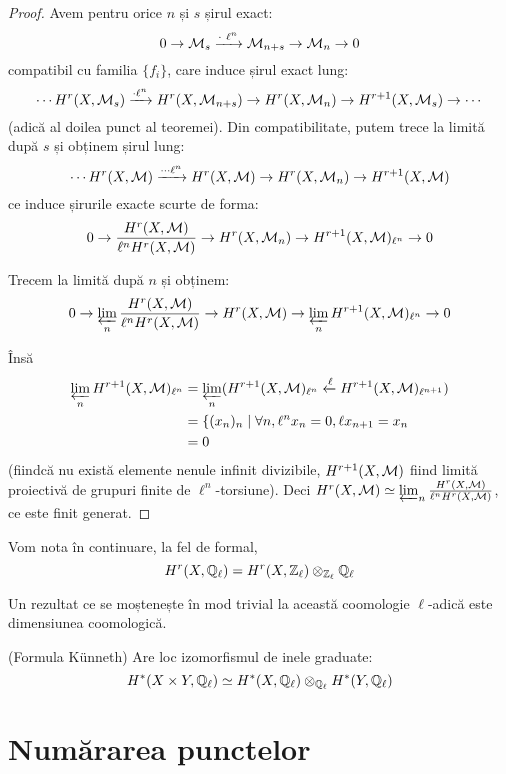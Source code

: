 \documentclass[13pt,openany]{book}
\begin{document}
\begin{proof}
Avem pentru orice $n$ și $s$ șirul exact:
$$0 \rightarrow \mathcal{M}_s \xrightarrow{\cdot\ \ell^n} \mathcal{M}_{n+s} \rightarrow \mathcal{M}_n \rightarrow 0$$
compatibil cu familia $\{f_i\}$, care induce șirul exact lung:
$$\cdots H^r(X,\mathcal{M}_s) \xrightarrow{\cdot \ell^n} H^r(X,\mathcal{M}_{n+s}) \rightarrow H^r(X,\mathcal{M}_n) \rightarrow H^{r+1}(X,\mathcal{M}_s) \rightarrow \cdots$$
(adică al doilea punct al teoremei).
Din compatibilitate, putem trece la limită după $s$ și obținem șirul lung:
$$\cdots H^r(X,\mathcal{M}) \xrightarrow{\cdots \ell^n} H^r(X,\mathcal{M}) \rightarrow H^r(X,\mathcal{M}_n) \rightarrow H^{r+1}(X,\mathcal{M})$$
ce induce șirurile exacte scurte de forma:
$$0 \rightarrow \frac{H^r(X,\mathcal{M})}{\ell^n H^r(X,\mathcal{M})} \rightarrow H^r(X,\mathcal{M}_n) \rightarrow H^{r+1}(X,\mathcal{M})_{\ell^n} \rightarrow 0$$

Trecem la limită după $n$ și obținem:
$$0 \rightarrow \varprojlim_n \frac{H^r(X,\mathcal{M})}{\ell^n H^r(X,\mathcal{M})} \rightarrow H^r(X,\mathcal{M}) \rightarrow \varprojlim_n H^{r+1}(X,\mathcal{M})_{\ell^n} \rightarrow 0$$

Însă
\begin{align*}
\varprojlim_n H^{r+1}(X,\mathcal{M})_{\ell^n} &= \varprojlim_n (H^{r+1}(X,\mathcal{M})_{\ell^n} \xleftarrow{\ell} H^{r+1}(X,\mathcal{M})_{\ell^{n+1}})\\
&=\{(x_n)_n \mid \forall n, \ell^n x_n=0, \ell x_{n+1}=x_n\\
&=0
\end{align*}
(fiindcă nu există elemente nenule infinit divizibile, $H^{r+1}(X,\mathcal{M})$ fiind limită proiectivă de grupuri finite de $\ell^n$-torsiune). Deci $H^r(X,\mathcal{M})\simeq \varprojlim_n \frac{H^r(X,\mathcal{M})}{\ell^n H^r(X,\mathcal{M})}$, ce este finit generat.
\end{proof}

Vom nota în continuare, la fel de formal,
$$H^r(X,\mathbb{Q}_\ell) = H^r(X,\mathbb{Z}_\ell) \otimes_{\mathbb{Z}_\ell} \mathbb{Q}_\ell$$

Un rezultat ce se moștenește în mod trivial la această coomologie $\ell$-adică este dimensiunea coomologică.

\begin{teo}
(Formula Künneth) Are loc izomorfismul de inele graduate:
$$H^*(X\times Y,\mathbb{Q}_\ell) \simeq H^*(X,\mathbb{Q}_\ell) \otimes_{\mathbb{Q}_\ell} H^*(Y,\mathbb{Q}_\ell)$$
\end{teo}



\chapter{Numărarea punctelor}
\end{document}
